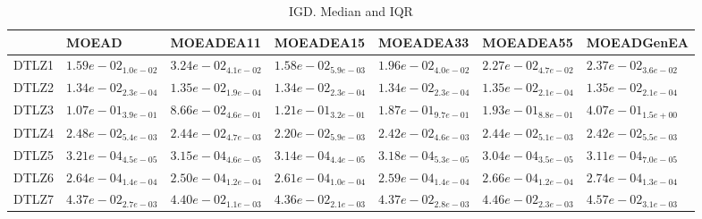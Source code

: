 \documentclass{article}
\begin{document}
\begin{table}
\caption{IGD. Median and IQR}
\label{table:median.IGD}
\begin{scriptsize}
\centering
\begin{tabular}{lllllll}
\hline & MOEAD & MOEADEA11 & MOEADEA15 & MOEADEA33 & MOEADEA55 &  MOEADGenEA\\
\hline
DTLZ1 & \cellcolor{gray25}$  1.59e-02_{ 1.0e-02}$ & $  3.24e-02_{ 4.1e-02}$ & \cellcolor{gray95}$  1.58e-02_{ 5.9e-03}$ & $  1.96e-02_{ 4.0e-02}$ & $  2.27e-02_{ 4.7e-02}$ & $  2.37e-02_{ 3.6e-02}$ \\
DTLZ2 & $  1.34e-02_{ 2.3e-04}$ & $  1.35e-02_{ 1.9e-04}$ & \cellcolor{gray25}$  1.34e-02_{ 2.3e-04}$ & \cellcolor{gray95}$  1.34e-02_{ 2.3e-04}$ & $  1.35e-02_{ 2.1e-04}$ & $  1.35e-02_{ 2.1e-04}$ \\
DTLZ3 & \cellcolor{gray25}$  1.07e-01_{ 3.9e-01}$ & \cellcolor{gray95}$  8.66e-02_{ 4.6e-01}$ & $  1.21e-01_{ 3.2e-01}$ & $  1.87e-01_{ 9.7e-01}$ & $  1.93e-01_{ 8.8e-01}$ & $  4.07e-01_{ 1.5e+00}$ \\
DTLZ4 & $  2.48e-02_{ 5.4e-03}$ & $  2.44e-02_{ 4.7e-03}$ & \cellcolor{gray95}$  2.20e-02_{ 5.9e-03}$ & \cellcolor{gray25}$  2.42e-02_{ 4.6e-03}$ & $  2.44e-02_{ 5.1e-03}$ & $  2.42e-02_{ 5.5e-03}$ \\
DTLZ5 & $  3.21e-04_{ 4.5e-05}$ & $  3.15e-04_{ 4.6e-05}$ & $  3.14e-04_{ 4.4e-05}$ & $  3.18e-04_{ 5.3e-05}$ & \cellcolor{gray95}$  3.04e-04_{ 3.5e-05}$ & $  3.11e-04_{ 7.0e-05}$ \\
DTLZ6 & $  2.64e-04_{ 1.4e-04}$ & \cellcolor{gray95}$  2.50e-04_{ 1.2e-04}$ & $  2.61e-04_{ 1.0e-04}$ & \cellcolor{gray25}$  2.59e-04_{ 1.4e-04}$ & $  2.66e-04_{ 1.2e-04}$ & $  2.74e-04_{ 1.3e-04}$ \\
DTLZ7 & \cellcolor{gray25}$  4.37e-02_{ 2.7e-03}$ & $  4.40e-02_{ 1.1e-03}$ & \cellcolor{gray95}$  4.36e-02_{ 2.1e-03}$ & $  4.37e-02_{ 2.8e-03}$ & $  4.46e-02_{ 2.3e-03}$ & $  4.57e-02_{ 3.1e-03}$ \\
\hline
\end{tabular}
\end{scriptsize}
\end{table}
\end{document}
